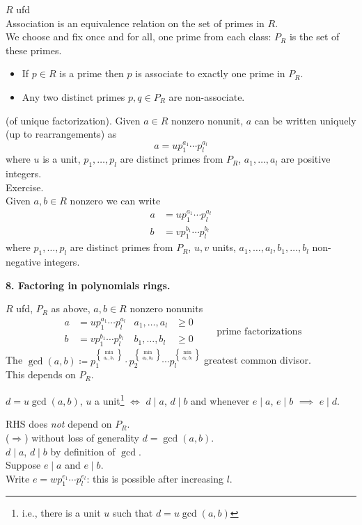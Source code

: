 $R$ ufd \\
Association is an equivalence relation on the set of primes in $R$. \\
We choose and fix once and for all, one prime from each class: $P_R$ is the set of these primes.
\begin{itemize}
\item If $p\in R$ is a prime then $p$ is associate to exactly one prime in $P_R$.
\item Any two distinct primes $p,q\in P_R$ are non-associate.
\end{itemize}
\cor (of unique factorization).  Given $a\in R$ nonzero nonunit, $a$ can be written uniquely (up to rearrangements) as
\[ a = up_1^{a_1}\dotsm p_l^{a_l} \]
where $u$ is a unit, $p_1,\dotsc,p_l$ are distinct primes from $P_R$, $a_1,\dotsc,a_l$ are positive integers. \\
\pf Exercise. \\
\remark Given $a,b\in R$ nonzero %
we can write
\begin{align*}
a &= u p_1^{a_1} \dotsm p_l^{a_l} \\
b &= v p_1^{b_1} \dotsm p_l^{b_l}
\end{align*}
where $p_1,\dotsc,p_l$ are distinct primes from $P_R$, $u,v$ units, $a_1,\dotsc,a_l,b_1,\dotsc,b_l$ non-negative integers.

\textbf{8.  Factoring in polynomials rings.}

 $R$ ufd, $P_R$ as above, $a,b\in R$ nonzero nonunits
\[ \begin{aligned}
a &= u p_1^{a_1} \dotsm p_l^{a_l} & a_1,\dotsc,a_l &\geq 0 \\
b &= v p_1^{b_1} \dotsm p_l^{b_l} & b_1,\dotsc,b_l &\geq 0
\end{aligned} \qquad \text{prime factorizations} \]
The $\gcd(a,b)\coloneqq p_1^{\min\brace{a_1,b_1}} \cdot p_2^{\min\brace{a_2,b_2}} \dotsm p_l^{\min\brace{a_l,b_l}}$ greatest common divisor. \\
\note This depends on $P_R$.

\lem $d=u\gcd(a,b)$, $u$ a unit\footnote{i.e., there is a unit $u$ such that $d=u\gcd(a,b)$} $\iff$ $d\mid a$, $d\mid b$ and whenever $e\mid a$, $e\mid b$ $\implies$ $e\mid d$.

\note RHS does \emph{not} depend on $P_R$. \\
\pf ($\Longrightarrow$) without loss of generality $d=\gcd(a,b)$. \\
$d\mid a$, $d\mid b$ by definition of $\gcd$. \\
Suppose $e\mid a$ and $e\mid b$. \\
Write $e=wp_1^{e_1}\dotsm p_l^{e_l}$: this is possible after increasing $l$.

